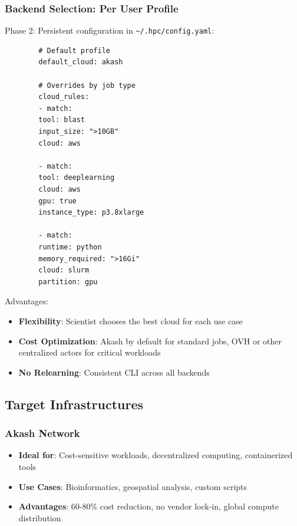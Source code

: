 \documentclass[11pt,a4paper]{article}
\begin{document}
	\subsubsection{Backend Selection: Per User Profile}
	
	Phase 2: Persistent configuration in \texttt{\textasciitilde/.hpc/config.yaml}:
	
	\begin{lstlisting}
		# Default profile
		default_cloud: akash
		
		# Overrides by job type
		cloud_rules:
		- match:
		tool: blast
		input_size: ">10GB"
		cloud: aws
		
		- match:
		tool: deeplearning
		cloud: aws
		gpu: true
		instance_type: p3.8xlarge
		
		- match:
		runtime: python
		memory_required: ">16Gi"
		cloud: slurm
		partition: gpu
	\end{lstlisting}
	
	Advantages:
	\begin{itemize}
		\item \textbf{Flexibility}: Scientist chooses the best cloud for each use case
		\item \textbf{Cost Optimization}: Akash by default for standard jobs, OVH or other centralized actors for critical workloads
		\item \textbf{No Relearning}: Consistent CLI across all backends
	\end{itemize}
	
	\newpage
	
	\subsection{Target Infrastructures}
	
	\subsubsection{Akash Network}
	
	\begin{itemize}
		\item \textbf{Ideal for}: Cost-sensitive workloads, decentralized computing, containerized tools
		\item \textbf{Use Cases}: Bioinformatics, geospatial analysis, custom scripts
		\item \textbf{Advantages}: 60-80\% cost reduction, no vendor lock-in, global compute distribution
	\end{itemize}
	
\end{document}
